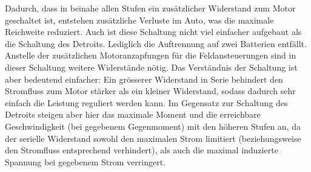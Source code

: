 Dadurch, dass in beinahe allen Stufen ein zusätzlicher Widerstand zum Motor geschaltet ist, entstehen zusätzliche Verluste im Auto, was die maximale Reichweite reduziert. Auch ist diese Schaltung nicht viel einfacher aufgebaut als die Schaltung des Detroits. Lediglich die Auftrennung auf zwei Batterien entfällt. Anstelle der zusätzlichen Motoranzapfungen für die Feldansteuerungen sind in dieser Schaltung weitere Widerstände nötig. Das Verständnis der Schaltung ist aber bedeutend einfacher: Ein grösserer Widerstand in Serie behindert den Stromfluss zum Motor stärker als ein kleiner Widerstand, sodass dadurch sehr einfach die Leistung reguliert werden kann. Im Gegensatz zur Schaltung des Detroits steigen aber hier das maximale Moment und die erreichbare Geschwindigkeit (bei gegebenem Gegenmoment) mit den höheren Stufen an, da der serielle Widerstand sowohl den maximalen Strom limitiert (beziehungsweise den Stromfluss entsprechend verhindert), als auch die maximal induzierte Spannung bei gegebenem Strom verringert.